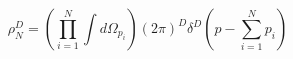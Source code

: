 \begin{equation}
 \rho_N^D = \left(\prod_{i=1}^N\int d\Omega_{p_i}\right)(2\pi)^D\delta^D
 (p-\sum_{i=1}^N p_i)
\end{equation}

